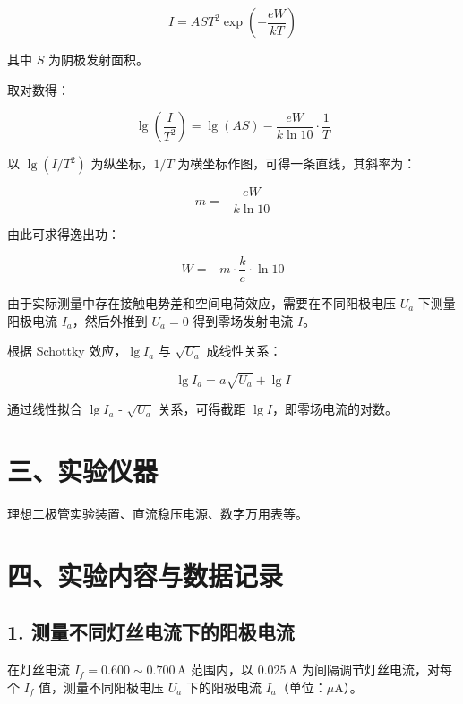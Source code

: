 \documentclass[UTF8,a4paper,zihao=-4]{ctexart}
\begin{document}
\begin{equation}
    I = A S T^2 \exp\left(-\frac{eW}{kT}\right)
\end{equation}

其中 $S$ 为阴极发射面积。

取对数得：

\begin{equation}
    \lg\left(\frac{I}{T^2}\right) = \lg(AS) - \frac{eW}{k\ln 10} \cdot \frac{1}{T}
\end{equation}

以 $\lg(I/T^2)$ 为纵坐标，$1/T$ 为横坐标作图，可得一条直线，其斜率为：

\begin{equation}
    m = -\frac{eW}{k\ln 10}
\end{equation}

由此可求得逸出功：

\begin{equation}
    W = -m \cdot \frac{k}{e} \cdot \ln 10
\end{equation}

由于实际测量中存在接触电势差和空间电荷效应，需要在不同阳极电压 $U_a$ 下测量阳极电流 $I_a$，然后外推到 $U_a = 0$ 得到零场发射电流 $I$。

根据 Schottky 效应，$\lg I_a$ 与 $\sqrt{U_a}$ 成线性关系：

\begin{equation}
    \lg I_a = a\sqrt{U_a} + \lg I
\end{equation}

通过线性拟合 $\lg I_a$ - $\sqrt{U_a}$ 关系，可得截距 $\lg I$，即零场电流的对数。

\section*{三、实验仪器}

理想二极管实验装置、直流稳压电源、数字万用表等。

\section*{四、实验内容与数据记录}

\subsection*{1. 测量不同灯丝电流下的阳极电流}

在灯丝电流 $I_f = 0.600\sim0.700\,\text{A}$ 范围内，以 $0.025\,\text{A}$ 为间隔调节灯丝电流，对每个 $I_f$ 值，测量不同阳极电压 $U_a$ 下的阳极电流 $I_a$（单位：$\mu\text{A}$）。
\end{document}
